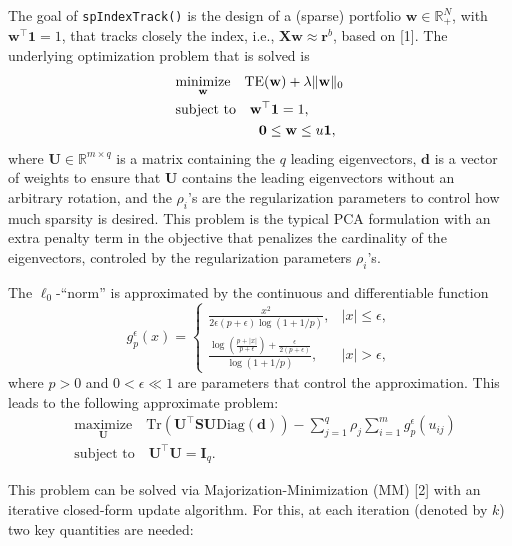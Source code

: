 \documentclass[]{article}
\begin{document}
The goal of \texttt{spIndexTrack()} is the design of a (sparse)
portfolio \(\mathbf{w}\in\mathbb{R}_+^N\), with
\(\mathbf{w}^\top\mathbf{1} = 1\), that tracks closely the index, i.e.,
\(\mathbf{X}\mathbf{w} \approx \mathbf{r}^b\), based on {[}1{]}. The
underlying optimization problem that is solved is \[
\begin{aligned}\label{opt:joint_index_tracking}
    &\underset{\mathbf{w}}{\text{minimize}}\quad \text{TE}(\mathbf{w}) + \lambda\|\mathbf{w}\|_0\\
    &\text{subject to}\quad \mathbf{w}^\top\mathbf{1}=1,\\
    &\hspace{21mm} \mathbf{0}\leq\mathbf{w}\leq u\mathbf{1},
\end{aligned}
\] where \(\mathbf{U}\in\mathbb{R}^{m\times q}\) is a matrix containing
the \(q\) leading eigenvectors, \(\mathbf{d}\) is a vector of weights to
ensure that \(\mathbf{U}\) contains the leading eigenvectors without an
arbitrary rotation, and the \(\rho_i\)'s are the regularization
parameters to control how much sparsity is desired. This problem is the
typical PCA formulation with an extra penalty term in the objective that
penalizes the cardinality of the eigenvectors, controled by the
regularization parameters \(\rho_i\)'s.

The \(\ell_0\)-``norm'' is approximated by the continuous and
differentiable function \[g_p^{\epsilon}\left(x \right)= \begin{cases}
    \frac{x^2}{2\epsilon(p+\epsilon)\log(1+1/p)},& |x|\leq\epsilon,\\
    \frac{\log\left(\frac{p+|x|}{p+\epsilon}\right)+\frac{\epsilon}{2(p+\epsilon)}}{\log(1+1/p)},& |x|>\epsilon,
    \end{cases}\] where \(p>0\) and \(0<\epsilon\ll1\) are parameters
that control the approximation. This leads to the following approximate
problem: \[\begin{aligned}
      &\underset{\mathbf{U}}{\text{maximize}}\quad \text{Tr} \left(\mathbf{U}^\top \mathbf{S} \mathbf{U} \text{Diag}   (\mathbf{d})\right) - \sum_{j=1}^{q}\rho_j\sum_{i=1}^{m}g_p^{\epsilon}\left(u_{ij}\right)\\
    &\text{subject to}\quad \mathbf{U}^\top\mathbf{U}=\mathbf{I}_q.
  \end{aligned}\]

This problem can be solved via Majorization-Minimization (MM) {[}2{]}
with an iterative closed-form update algorithm. For this, at each
iteration (denoted by \(k\)) two key quantities are needed:
\end{document}
